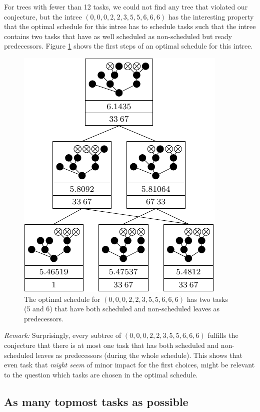 For trees with fewer than 12 tasks, we could not find any tree that violated our conjecture, but the intree $(0,0,0,2,2,3,5,5,6,6,6)$ has the interesting property that the optimal schedule for this intree has to schedule tasks such that the intree contains two tasks that have as well scheduled as non-scheduled but ready predecessors. Figure \ref{fig:filling-op-is-not-strictly-optimal} shows the first steps of an optimal schedule for this intree.

\begin{figure}[th]
  \centering
  \includegraphics{p3/suboptimal/00022355666_optimal_no_fill_up.pdf}
  \caption{The optimal schedule for $(0,0,0,2,2,3,5,5,6,6,6)$ has two tasks (5 and 6) that have both scheduled and non-scheduled leaves as predecessors.}
  \label{fig:filling-op-is-not-strictly-optimal}
\end{figure}

\emph{Remark:} Surprisingly, every subtree of $(0,0,0,2,2,3,5,5,6,6,6)$ fulfills the conjecture that there is at most one task that has both scheduled and non-scheduled leaves as predecessors (during the whole schedule). This shows that even task that \emph{might seem} of minor impact for the first choices, might be relevant to the question which tasks are chosen in the optimal schedule.

\subsection{As many topmost tasks as possible}
\label{sec:suboptimal-hlf-refinement-as-many-topmost-possible}


